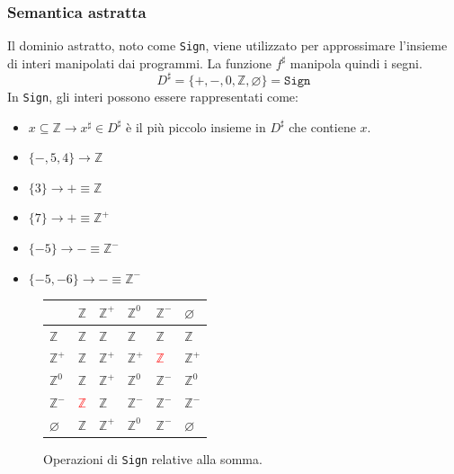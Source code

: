 \subsubsection{Semantica astratta}
Il dominio astratto, noto come \texttt{Sign}, viene utilizzato per approssimare
l'insieme di interi manipolati dai programmi. La funzione $f^\sharp$ manipola quindi i segni. 
\[
  D^\sharp = \{+, -, 0, \mathbb{Z}, \varnothing\} = \texttt{Sign}
\]
In \texttt{Sign},
gli interi possono essere rappresentati come:

\begin{itemize}
  \item $x \subseteq \mathbb{Z} \rightarrow x^\sharp \in D^\sharp$ è il più piccolo 
  insieme in $D^\sharp$ che contiene $x$.
  \item \(\{-,5,4 \} \rightarrow \mathbb{Z}\)
  \item \(\{ 3 \} \rightarrow + \equiv \mathbb{Z}\)
  \item \(\{ 7 \}  \rightarrow + \equiv \mathbb{Z}^{+}\)
  \item \(\{-5 \} \rightarrow - \equiv \mathbb{Z}^{-}\)
  \item \( \{ -5, -6 \} \rightarrow - \equiv \mathbb{Z}^{-}\)
\end{itemize}
\begin{minipage}[t]{0.4\textwidth}
  \begin{figure}[H]
  \centering
  \renewcommand{\arraystretch}{2}
  \begin{tabular}{|m{2em}|m{2em}|m{2em}|m{2em}|m{2em}|m{2em}|}
      \hline
       & $\mathbb{Z}$ & $\mathbb{Z}^+$ & $\mathbb{Z}^0$ & $\mathbb{Z}^-$ & $\varnothing$ \\
      \hline
      $\mathbb{Z}$ & $\mathbb{Z}$ & $\mathbb{Z}$ & $\mathbb{Z}$ & $\mathbb{Z}$ & $\mathbb{Z}$ \\
      \hline
      $\mathbb{Z}^+$ & $\mathbb{Z}$ & $\mathbb{Z}^+$ & $\mathbb{Z}^+$ & \textcolor{red}{$\mathbb{Z}$} & $\mathbb{Z}^+$ \\
      \hline
      $\mathbb{Z}^0$ & $\mathbb{Z}$ & $\mathbb{Z}^+$ & $\mathbb{Z}^0$ & $\mathbb{Z}^-$ & $\mathbb{Z}^0$ \\
      \hline
      $\mathbb{Z}^-$ & \textcolor{red}{$\mathbb{Z}$}  & $\mathbb{Z}$ & $\mathbb{Z}^-$ & $\mathbb{Z}^-$ & $\mathbb{Z}^-$ \\
      \hline
      $\varnothing$ & $\mathbb{Z}$ & $\mathbb{Z}^+$ & $\mathbb{Z}^0$ & $\mathbb{Z}^-$ & $\varnothing$ \\
      \hline
    \end{tabular}
    \caption{Operazioni di \texttt{Sign} relative alla somma.}
  \end{figure}
\end{minipage}
